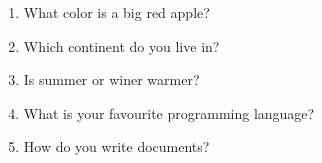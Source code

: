 \documentclass[12pt,onside,a4paper,article]{memoir}
\begin{document}
\begin{enumerate}\itemsep30mm




\item{What color is a big red apple?}
\begin{flushright}
\end{flushright}
\item{Which continent do you live in?}
\begin{flushright}
\end{flushright}
\item{Is summer or winer warmer?}
\begin{flushright}
\end{flushright}
\item{What is your favourite programming language?}
\begin{flushright}
\end{flushright}
\item{How do you write documents?}
\begin{flushright}
\end{flushright}
\end{enumerate}
\end{document}

